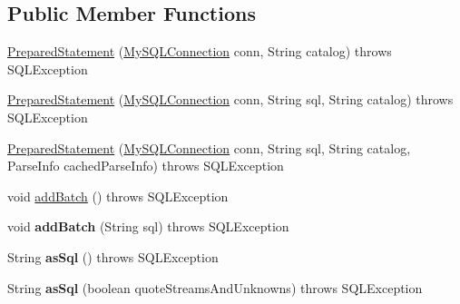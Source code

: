 \subsection*{Public Member Functions}
\begin{DoxyCompactItemize}
\item 
\mbox{\hyperlink{classcom_1_1mysql_1_1jdbc_1_1_prepared_statement_af1784431accedc207e4dc40ff2f7f9e5}{Prepared\+Statement}} (\mbox{\hyperlink{interfacecom_1_1mysql_1_1jdbc_1_1_my_s_q_l_connection}{My\+S\+Q\+L\+Connection}} conn, String catalog)  throws S\+Q\+L\+Exception 
\item 
\mbox{\hyperlink{classcom_1_1mysql_1_1jdbc_1_1_prepared_statement_ad3d4c96994b71d52559d3d084ada8276}{Prepared\+Statement}} (\mbox{\hyperlink{interfacecom_1_1mysql_1_1jdbc_1_1_my_s_q_l_connection}{My\+S\+Q\+L\+Connection}} conn, String sql, String catalog)  throws S\+Q\+L\+Exception 
\item 
\mbox{\hyperlink{classcom_1_1mysql_1_1jdbc_1_1_prepared_statement_a29276b227ce437739a5d554a91c348c2}{Prepared\+Statement}} (\mbox{\hyperlink{interfacecom_1_1mysql_1_1jdbc_1_1_my_s_q_l_connection}{My\+S\+Q\+L\+Connection}} conn, String sql, String catalog, Parse\+Info cached\+Parse\+Info)  throws S\+Q\+L\+Exception 
\item 
void \mbox{\hyperlink{classcom_1_1mysql_1_1jdbc_1_1_prepared_statement_ade546357756baf1a168cc652c5a4de84}{add\+Batch}} ()  throws S\+Q\+L\+Exception 
\item 
\mbox{\label{classcom_1_1mysql_1_1jdbc_1_1_prepared_statement_abbb884a425426709aa5068ee1b375de6}} 
void {\bfseries add\+Batch} (String sql)  throws S\+Q\+L\+Exception 
\item 
\mbox{\label{classcom_1_1mysql_1_1jdbc_1_1_prepared_statement_a525b09b122fa04efbc903ec484ae1020}} 
String {\bfseries as\+Sql} ()  throws S\+Q\+L\+Exception 
\item 
\mbox{\label{classcom_1_1mysql_1_1jdbc_1_1_prepared_statement_a2e55d41f5fde41c65828433a9dc38a18}} 
String {\bfseries as\+Sql} (boolean quote\+Streams\+And\+Unknowns)  throws S\+Q\+L\+Exception 
\item 
\mbox{\label{classcom_1_1mysql_1_1jdbc_1_1_prepared_statement_a8e22121add1e1ecf9d24616de5ec8002}} 

\end{DoxyCompactItemize}
